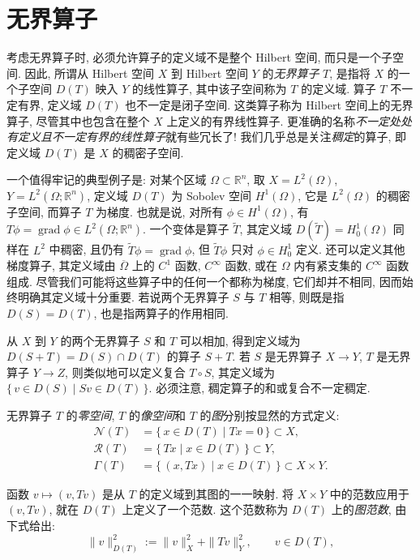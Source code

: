 \section{无界算子}\label{sec:unbounded-operators}

考虑无界算子时, 必须允许算子的定义域不是整个 Hilbert 空间, 而只是一个子空间. 因此, 所谓从 Hilbert 空间 $X$ 到 Hilbert 空间 $Y$ 的\emph{无界算子} $T$, 是指将 $X$ 的一个子空间 $D(T)$ 映入 $Y$ 的线性算子, 其中该子空间称为 $T$ 的定义域. 算子 $T$ 不一定有界, 定义域 $D(T)$ 也不一定是闭子空间. 这类算子称为 Hilbert 空间上的无界算子, 尽管其中也包含在整个 $X$ 上定义的有界线性算子. 更准确的名称\emph{不一定处处有定义且不一定有界的线性算子}就有些冗长了! 我们几乎总是关注\emph{稠定}的算子, 即定义域 $D(T)$ 是 $X$ 的稠密子空间. 

一个值得牢记的典型例子是: 对某个区域 $\Omega\subset\mathbb R^n$, 取 $X=L^2(\Omega)$, $Y=L^2(\Omega;\mathbb R^n)$, 定义域 $D(T)$ 为 Sobolev 空间 $H^1(\Omega)$, 它是 $L^2(\Omega)$ 的稠密子空间, 而算子 $T$ 为梯度. 也就是说, 对所有 $\phi\in H^1(\Omega)$, 有 $T\phi=\operatorname{grad}\phi\in L^2(\Omega;\mathbb R^n)$. 一个变体是算子 $\widetilde T$, 其定义域 $D(\widetilde T)=H_0^1(\Omega)$ 同样在 $L^2$ 中稠密, 且仍有 $\widetilde T\phi=\operatorname{grad}\phi$, 但 $\widetilde T\phi$ 只对 $\phi\in H_0^1$ 定义. 还可以定义其他梯度算子, 其定义域由 $\overline\Omega$ 上的 $C^1$ 函数, $C^\infty$ 函数, 或在 $\Omega$ 内有紧支集的 $C^\infty$ 函数组成. 尽管我们可能将这些算子中的任何一个都称为梯度, 它们却并不相同, 因而始终明确其定义域十分重要. 若说两个无界算子 $S$ 与 $T$ 相等, 则既是指 $D(S)=D(T)$, 也是指两算子的作用相同.

从 $X$ 到 $Y$ 的两个无界算子 $S$ 和 $T$ 可以相加, 得到定义域为 $D(S+T)=D(S)\cap D(T)$ 的算子 $S+T$. 若 $S$ 是无界算子 $X\to Y$, $T$ 是无界算子 $Y\to Z$, 则类似地可以定义复合 $T\circ S$, 其定义域为 $\{\,v\in D(S)\mid Sv\in D(T)\,\}$. 必须注意, 稠定算子的和或复合不一定稠定.

无界算子 $T$ 的\emph{零空间}, $T$ 的\emph{像空间}和 $T$ 的\emph{图}分别按显然的方式定义:
\[
\begin{aligned}
\mathcal N(T)&=\{\,x\in D(T)\mid Tx=0\,\}\subset X,\\
\mathcal R(T)&=\{\,Tx\mid x\in D(T)\,\}\subset Y,\\
\Gamma(T)&=\{\,(x,Tx)\mid x\in D(T)\,\}\subset X\times Y.
\end{aligned}
\]

函数 $v\mapsto(v,Tv)$ 是从 $T$ 的定义域到其图的一一映射. 将 $X\times Y$ 中的范数应用于 $(v,Tv)$, 就在 $D(T)$ 上定义了一个范数. 这个范数称为 $D(T)$ 上的\emph{图范数}, 由下式给出:
\[
\|v\|_{D(T)}^2:=\|v\|_X^2+\|Tv\|_Y^2,\qquad v\in D(T),
\]

